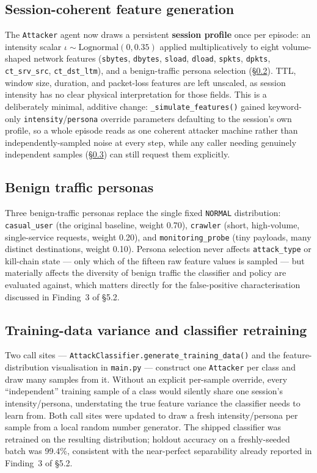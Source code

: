 \subsection{Session-coherent feature generation}

The \texttt{Attacker} agent now draws a persistent \textbf{session
profile} once per episode: an intensity scalar
$\iota \sim \text{Lognormal}(0, 0.35)$ applied multiplicatively to eight
volume-shaped network features (\texttt{sbytes}, \texttt{dbytes},
\texttt{sload}, \texttt{dload}, \texttt{spkts}, \texttt{dpkts},
\texttt{ct\_srv\_src}, \texttt{ct\_dst\_ltm}), and a benign-traffic
persona selection (\S\ref{subsec:personas}). TTL, window size, duration,
and packet-loss features are left unscaled, as session intensity has no
clear physical interpretation for those fields. This is a deliberately
minimal, additive change: \texttt{\_simulate\_features()} gained
keyword-only \texttt{intensity}/\texttt{persona} override parameters
defaulting to the session's own profile, so a whole episode reads as one
coherent attacker machine rather than independently-sampled noise at
every step, while any caller needing genuinely independent samples
(\S\ref{subsec:retraining}) can still request them explicitly.

\subsection{Benign traffic personas}
\label{subsec:personas}

Three benign-traffic personas replace the single fixed \texttt{NORMAL}
distribution: \texttt{casual\_user} (the original baseline, weight 0.70),
\texttt{crawler} (short, high-volume, single-service requests, weight
0.20), and \texttt{monitoring\_probe} (tiny payloads, many distinct
destinations, weight 0.10). Persona selection never affects
\texttt{attack\_type} or kill-chain state --- only which of the fifteen
raw feature values is sampled --- but materially affects the diversity of
benign traffic the classifier and policy are evaluated against, which
matters directly for the false-positive characterisation discussed in
Finding~3 of \S5.2.

\subsection{Training-data variance and classifier retraining}
\label{subsec:retraining}

Two call sites --- \texttt{AttackClassifier.generate\_training\_data()}
and the feature-distribution visualisation in \texttt{main.py} ---
construct one \texttt{Attacker} per class and draw many samples from it.
Without an explicit per-sample override, every ``independent'' training
sample of a class would silently share one session's intensity/persona,
understating the true feature variance the classifier needs to learn
from. Both call sites were updated to draw a fresh intensity/persona per
sample from a local random number generator. The shipped classifier was
retrained on the resulting distribution; holdout accuracy on a
freshly-seeded batch was 99.4\%, consistent with the near-perfect
separability already reported in Finding~3 of \S5.2.

